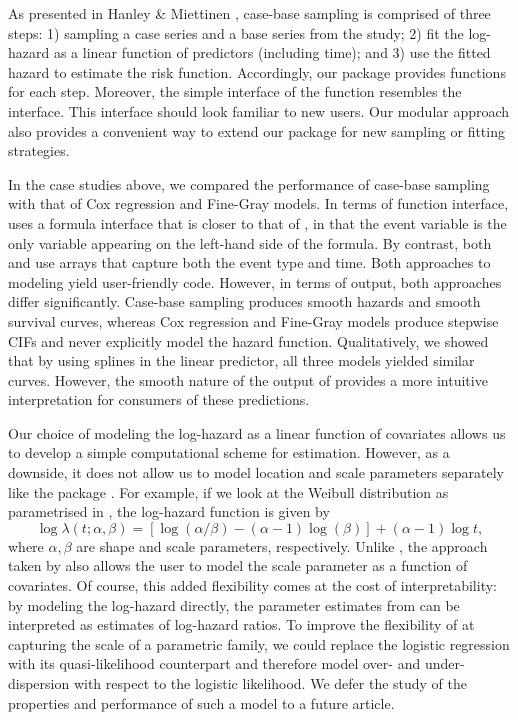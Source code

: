As presented in Hanley \& Miettinen \citeyearpar{hanley2009fitting},
case-base sampling is comprised of three steps: 1) sampling a case
series and a base series from the study; 2) fit the log-hazard as a
linear function of predictors (including time); and 3) use the fitted
hazard to estimate the risk function. Accordingly, our package provides
functions for each step. Moreover, the simple interface of the
 function resembles the  interface.
This interface should look familiar to new users. Our modular approach
also provides a convenient way to extend our package for new sampling or
fitting strategies.

In the case studies above, we compared the performance of case-base
sampling with that of Cox regression and Fine-Gray models. In terms of
function interface,  uses a formula interface that is
closer to that of , in that the event variable is the only
variable appearing on the left-hand side of the formula. By contrast,
both  and  use arrays
that capture both the event type and time. Both approaches to modeling
yield user-friendly code. However, in terms of output, both approaches
differ significantly. Case-base sampling produces smooth hazards and
smooth survival curves, whereas Cox regression and Fine-Gray models
produce stepwise CIFs and never explicitly model the hazard function.
Qualitatively, we showed that by using splines in the linear predictor,
all three models yielded similar curves. However, the smooth nature of
the output of  provides a more intuitive interpretation
for consumers of these predictions.

Our choice of modeling the log-hazard as a linear function of covariates
allows us to develop a simple computational scheme for estimation.
However, as a downside, it does not allow us to model location and scale
parameters separately like the package . For example, if
we look at the Weibull distribution as parametrised in
, the log-hazard function is given by
\[ \log \lambda(t; \alpha, \beta) = \left[\log(\alpha/\beta) - (\alpha - 1)\log(\beta)\right] + (\alpha - 1)\log t,\]
where \(\alpha,\beta\) are shape and scale parameters, respectively.
Unlike , the approach taken by  also allows
the user to model the scale parameter as a function of covariates. Of
course, this added flexibility comes at the cost of interpretability: by
modeling the log-hazard directly, the parameter estimates from
 can be interpreted as estimates of log-hazard ratios. To
improve the flexibility of  at capturing the scale of a
parametric family, we could replace the logistic regression with its
quasi-likelihood counterpart and therefore model over- and
under-dispersion with respect to the logistic likelihood. We defer the
study of the properties and performance of such a model to a future
article.

